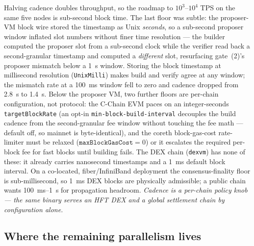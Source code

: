 Halving cadence doubles throughput, so the roadmap to
$10^3$--$10^4$ TPS on the same five nodes is sub-second block time. The
last floor was subtle: the proposer-VM block wire stored the timestamp
as Unix \emph{seconds}, so a sub-second proposer window inflated slot
numbers without finer time resolution --- the builder computed the
proposer slot from a sub-second clock while the verifier read back a
second-granular timestamp and computed a \emph{different} slot,
resurfacing gate~(2)'s proposer mismatch below a \SI{1}{\second} window.
Storing the block timestamp at millisecond resolution
(\texttt{UnixMilli}) makes build and verify agree at any window; the
mismatch rate at a \SI{100}{\milli\second} window fell to zero and
cadence dropped from \SI{2.8}{\second} to \SI{1.4}{\second}. Below the
proposer VM, two further floors are per-chain configuration, not
protocol: the C-Chain EVM paces on an integer-seconds
\texttt{targetBlockRate} (an opt-in \texttt{min-block-build-interval}
decouples the build cadence from the second-granular fee window without
touching the fee math --- default off, so mainnet is byte-identical),
and the coreth block-gas-cost rate-limiter must be relaxed
($\texttt{maxBlockGasCost}=0$) or it escalates the required per-block fee
for fast blocks until building fails. The DEX chain (\texttt{dexvm}) has
none of these: it already carries nanosecond timestamps and a
\SI{1}{\milli\second} default block interval. On a co-located,
fiber/InfiniBand deployment the consensus-finality floor is
sub-millisecond, so \SI{1}{\milli\second} DEX blocks are physically
admissible; a public chain wants \SI{100}{\milli\second}--\SI{1}{\second}
for propagation headroom. \emph{Cadence is a per-chain policy knob ---
the same binary serves an HFT DEX and a global settlement chain by
configuration alone.}

\subsection{Where the remaining parallelism lives}

